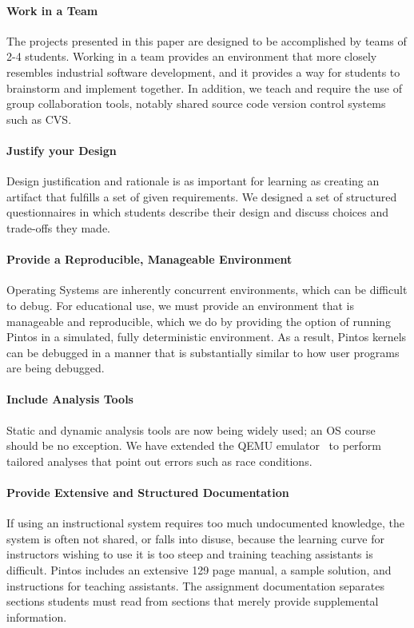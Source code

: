 \paragraph{Work in a Team}
The projects presented in this paper are designed to be accomplished by teams of 
2-4 students.  Working in a team provides an environment that more closely resembles
industrial software development, and it provides a way for students to brainstorm and
implement together.  In addition, we teach and require the use of group collaboration tools,
notably shared source code version control systems such as CVS.

\paragraph{Justify your Design}
Design justification and rationale is as important for learning as creating an artifact 
that fulfills a set of given requirements.  We designed a set of structured questionnaires 
in which students describe their design and discuss choices and trade-offs they made.

\paragraph{Provide a Reproducible, Manageable Environment}
Operating Systems are inherently concurrent environments, which can be difficult
to debug.  For educational use, we must provide an environment that is
manageable and reproducible, which we do by providing the option
of running Pintos in a simulated, fully deterministic environment.  
As a result, Pintos kernels can be debugged in a manner that
is substantially similar to how user programs are being debugged.

\paragraph{Include Analysis Tools}
Static and dynamic analysis tools are now being widely used; an OS course should
be no exception.  We have extended the QEMU emulator~\cite{Bellard2005QEMU} to 
perform tailored analyses that point out errors such as race conditions.

\paragraph{Provide Extensive and Structured Documentation}
If using an instructional system requires too much undocumented knowledge,
the system is often not shared, or falls into disuse, because the learning curve
for instructors wishing to use it is too steep and training teaching assistants is difficult.
Pintos includes an extensive 129 page manual, a sample solution,
and instructions for teaching assistants.  The assignment documentation separates sections 
students must read from sections that merely provide supplemental information.

